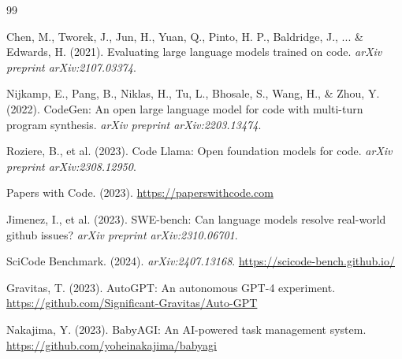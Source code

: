 \documentclass[10pt]{article}
\begin{document}
\begin{thebibliography}{99}

Chen, M., Tworek, J., Jun, H., Yuan, Q., Pinto, H. P., Baldridge, J., ... \& Edwards, H. (2021).
Evaluating large language models trained on code.
\textit{arXiv preprint arXiv:2107.03374}.

Nijkamp, E., Pang, B., Niklas, H., Tu, L., Bhosale, S., Wang, H., \& Zhou, Y. (2022).
CodeGen: An open large language model for code with multi-turn program synthesis.
\textit{arXiv preprint arXiv:2203.13474}.

Roziere, B., et al. (2023).
Code Llama: Open foundation models for code.
\textit{arXiv preprint arXiv:2308.12950}.

Papers with Code. (2023).
\url{https://paperswithcode.com}

Jimenez, I., et al. (2023).
SWE-bench: Can language models resolve real-world github issues?
\textit{arXiv preprint arXiv:2310.06701}.

SciCode Benchmark. (2024).
\textit{arXiv:2407.13168}.
\url{https://scicode-bench.github.io/}

Gravitas, T. (2023).
AutoGPT: An autonomous GPT-4 experiment.
\url{https://github.com/Significant-Gravitas/Auto-GPT}

Nakajima, Y. (2023).
BabyAGI: An AI-powered task management system.
\url{https://github.com/yoheinakajima/babyagi}

\end{thebibliography}
\end{document}
